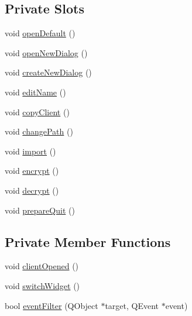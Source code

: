\subsection*{Private Slots}
\begin{CompactItemize}
\item 
void \hyperlink{classMainStack_k0}{open\-Default} ()
\item 
void \hyperlink{classMainStack_k1}{open\-New\-Dialog} ()
\item 
void \hyperlink{classMainStack_k2}{create\-New\-Dialog} ()
\item 
void \hyperlink{classMainStack_k3}{edit\-Name} ()
\item 
void \hyperlink{classMainStack_k4}{copy\-Client} ()
\item 
void \hyperlink{classMainStack_k5}{change\-Path} ()
\item 
void \hyperlink{classMainStack_k6}{import} ()
\item 
void \hyperlink{classMainStack_k7}{encrypt} ()
\item 
void \hyperlink{classMainStack_k8}{decrypt} ()
\item 
void \hyperlink{classMainStack_k9}{prepare\-Quit} ()
\end{CompactItemize}
\subsection*{Private Member Functions}
\begin{CompactItemize}
\item 
void \hyperlink{classMainStack_d0}{client\-Opened} ()
\item 
void \hyperlink{classMainStack_d1}{switch\-Widget} ()
\item 
bool \hyperlink{classMainStack_d2}{event\-Filter} (QObject $\ast$target, QEvent $\ast$event)
\end{CompactItemize}
